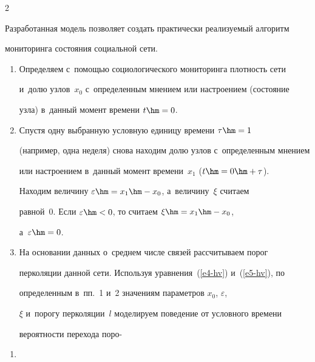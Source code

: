 \begin{multicols}{2}
\vspace*{-2pt}





  Разработанная модель позволяет создать практически реализуемый алгоритм 


мониторинга состояния социальной сети.\\[-12pt]


\begin{enumerate}[1.]


\item Определяем с~помощью социологического мониторинга плотность сети 


и~долю узлов~$x_0$ с~определенным мнением или настроением (состояние 


узла) в~данный момент времени $t\hm=0$.\\[-15pt]


\item Спустя одну выбранную условную единицу времени $\tau\hm=1$ 


(например, одна неделя) снова находим долю узлов с~определенным мнением 


или настроением в~данный момент времени~$x_1$ ($t\hm=0\hm +\tau$). 


Находим величину $\varepsilon\hm=x_1 \hm- x_0$, а~величину~$\xi$ считаем 


равной~0. Если $\varepsilon\hm<0$, то считаем $\xi\hm= x_1 \hm- x_0$, 


а~$\varepsilon\hm=0$.\\[-15pt]


\item На основании данных о~среднем числе связей рассчитываем порог 


перколяции данной сети. Используя уравнения~(\ref{e4-hv}) и~(\ref{e5-hv}), по 


определенным в~пп.~1 и~2 значениям параметров $x_0$, $\varepsilon$, 


$\xi$ и~порогу перколяции~$l$ моделируем поведение от условного времени 


вероятности перехода поро-\linebreak\vspace*{-12pt}


\end{enumerate}





\begin{enumerate}


\item[\,]



\end{enumerate}
\end{multicols}
